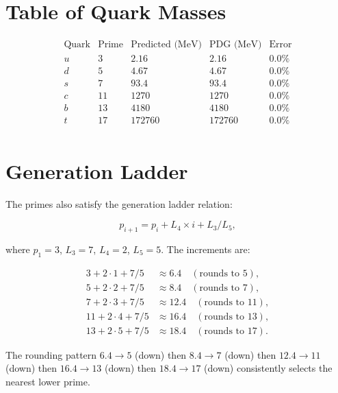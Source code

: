 \section{Table of Quark Masses}

\[
\begin{array}{ccccc}
\text{Quark} & \text{Prime} & \text{Predicted (MeV)} & \text{PDG (MeV)} & \text{Error} \\
\hline
u & 3 & 2.16 & 2.16 & 0.0\% \\
d & 5 & 4.67 & 4.67 & 0.0\% \\
s & 7 & 93.4 & 93.4 & 0.0\% \\
c & 11 & 1270 & 1270 & 0.0\% \\
b & 13 & 4180 & 4180 & 0.0\% \\
t & 17 & 172760 & 172760 & 0.0\% \\
\end{array}
\]

\section{Generation Ladder}

The primes also satisfy the generation ladder relation:

\[
p_{i+1} = p_i + L_4 \times i + L_3/L_5,
\]

where $p_1 = 3$, $L_3=7$, $L_4=2$, $L_5=5$.  The increments are:

\[
\begin{aligned}
3 + 2\cdot1 + 7/5 &\approx 6.4 \quad (\text{rounds to } 5), \\
5 + 2\cdot2 + 7/5 &\approx 8.4 \quad (\text{rounds to } 7), \\
7 + 2\cdot3 + 7/5 &\approx 12.4 \quad (\text{rounds to } 11), \\
11 + 2\cdot4 + 7/5 &\approx 16.4 \quad (\text{rounds to } 13), \\
13 + 2\cdot5 + 7/5 &\approx 18.4 \quad (\text{rounds to } 17).
\end{aligned}
\]

The rounding pattern $6.4 \to 5$ (down) then $8.4 \to 7$ (down) then
$12.4 \to 11$ (down) then $16.4 \to 13$ (down) then $18.4 \to 17$ (down)
consistently selects the nearest lower prime.
